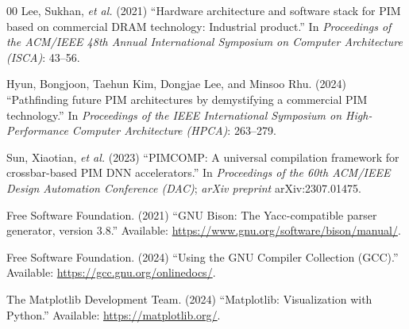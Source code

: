 \documentclass{ieeeaccess}
\begin{document}
\begin{thebibliography}{00}
 Lee, Sukhan, \emph{et al.} (2021) ``Hardware architecture and software stack for PIM based on commercial DRAM technology: Industrial product.'' In \emph{Proceedings of the ACM/IEEE 48th Annual International Symposium on Computer Architecture (ISCA)}: 43--56.

 Hyun, Bongjoon, Taehun Kim, Dongjae Lee, and Minsoo Rhu. (2024) ``Pathfinding future PIM architectures by demystifying a commercial PIM technology.'' In \emph{Proceedings of the IEEE International Symposium on High-Performance Computer Architecture (HPCA)}: 263--279.

 Sun, Xiaotian, \emph{et al.} (2023) ``PIMCOMP: A universal compilation framework for crossbar-based PIM DNN accelerators.'' In \emph{Proceedings of the 60th ACM/IEEE Design Automation Conference (DAC)}; \emph{arXiv preprint} arXiv:2307.01475.

 Free Software Foundation. (2021) ``GNU Bison: The Yacc-compatible parser generator, version 3.8.'' Available: \url{https://www.gnu.org/software/bison/manual/}.

 Free Software Foundation. (2024) ``Using the GNU Compiler Collection (GCC).'' Available: \url{https://gcc.gnu.org/onlinedocs/}.

 The Matplotlib Development Team. (2024) ``Matplotlib: Visualization with Python.'' Available: \url{https://matplotlib.org/}.

\end{thebibliography}

\EOD
\end{document}
